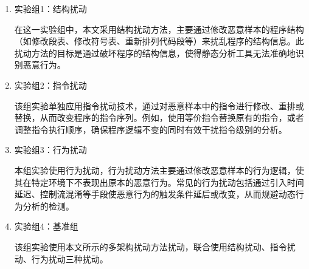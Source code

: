 \begin{enumerate}

\item 实验组1：结构扰动


在这一实验组中，本文采用结构扰动方法，主要通过修改恶意样本的程序结构（如修改段表、修改符号表、重新排列代码段等）来扰乱程序的结构信息。此扰动方法的目标是通过破坏程序的结构信息，使得静态分析工具无法准确地识别恶意行为。


\item 实验组2：指令扰动


该组实验单独应用指令扰动技术，通过对恶意样本中的指令进行修改、重排或替换，从而改变程序的指令序列。例如，使用等价指令替换原有的指令，或者调整指令执行顺序，确保程序逻辑不变的同时有效干扰指令级别的分析。


\item 实验组3：行为扰动


本组实验使用行为扰动，行为扰动方法主要通过修改恶意样本的行为逻辑，使其在特定环境下不表现出原本的恶意行为。常见的行为扰动包括通过引入时间延迟、控制流混淆等手段使恶意行为的触发条件延后或改变，从而规避动态行为分析的检测。


\item 实验组4：基准组


该组实验使用本文所示的多架构扰动方法扰动，联合使用结构扰动、指令扰动、行为扰动三种扰动。

\end{enumerate}

